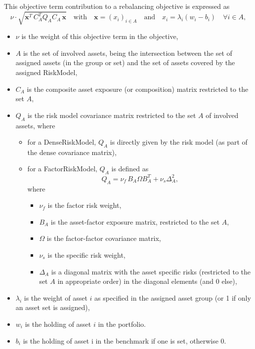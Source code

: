       This objective term contribution to a rebalancing objective is expressed as 
      \[
          \nu\cdot\sqrt{\mathbf{x}^T\,C_A^T Q_A C_A\, \mathbf{x}} \quad 
          \text{with}\quad \mathbf{x}=\left(x_i\right)_{i\in A}   \quad
          \text{and} \quad x_i=\lambda_i(w_i-b_i) \quad \forall i\in A,
      \]
     \begin{itemize}
		  \item $\nu$ is the weight of this objective term in the objective, 
        \item $A$ is the set of involved assets, being the intersection between the set of assigned assets (in the group or set)
              and the set of assets covered by the assigned RiskModel, 
        \item $C_A$ is the composite asset exposure (or composition) matrix restricted to the set $A$, 
        \item $Q_A$ is the risk model covariance matrix restricted to the set $A$ of involved assets, where
            \begin{itemize}
               \item for a DenseRiskModel, $Q_A$ is directly given by the risk model (as part of the dense covariance matrix), 
               \item for a FactorRiskModel, $Q_A$ is defined as
                   \[
                       Q_A = \nu_f\,B_A\Omega B_A^T +\nu_s\Delta^2_A,
                   \]
                    where
                    \begin{itemize}
								\item $\nu_f$ is the factor risk weight, 
								\item $B_A$ is the asset-factor exposure matrix, restricted to the set $A$, 
								\item $\Omega$ is the factor-factor covariance matrix, 
								\item $\nu_s$ is the specific risk weight, 
								\item $\Delta_A$ is a diagonal matrix with the asset specific risks
                             (restricted to the set $A$ in appropriate order) in the diagonal elements (and 0 else), 
                    \end{itemize}
            \end{itemize}
         \item $\lambda_i$ is the weight of asset $i$ as specified in the assigned asset group (or 1 if only an asset set is assigned), 
         \item $w_i$ is the holding of asset $i$ in the portfolio. 
         \item $b_i$ is the holding of asset i in the benchmark if one is set, otherwise 0. 
     \end{itemize}


